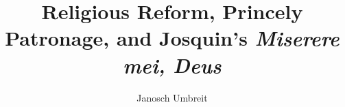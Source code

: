
    \author{Janosch Umbreit} %
    \newcommand{\authormail}{} %
    \newcommand{\matrikelnr}{} %
    \newcommand{\authoraddress}{} %
    
    \newcommand{\city}{} %
    \newcommand{\university}{} %
    \newcommand{\faculty}{} %
    \newcommand{\department}{} %
    \newcommand{\handindate}{} %
    
    \newcommand{\tutor}{} %
    \newcommand{\coursetype}{} %
    \newcommand{\coursetitle}{} %
    \newcommand{\coursenumber}{} %
    
    \title{
        Religious Reform, Princely Patronage, and Josquin's \emph{Miserere mei, Deus}} %
    \date{}
    \newcommand{\papertype}{} %
    \newcommand{\keywords}{} %
    
    \newcommand{\mainlanguage}{UKenglish} 
    \usepackage[ngerman, \mainlanguage]{babel}
%
%
\usepackage[babel]{csquotes}

\usepackage[style=mla,backend=biber]{biblatex}
  
%
%

